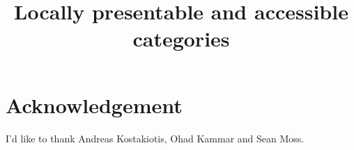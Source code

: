 \documentclass[11pt,a4paper]{article}
\title{Locally presentable and accessible categories}
\theoremstyle{margin}
\theoremstyle{nonumberplain}
\begin{document}
\maketitle

\pagebreak
\tableofcontents
\pagebreak


\parindent0cm


 \pagebreak
 \pagebreak
 \pagebreak
 \pagebreak
 \pagebreak
 \pagebreak

\section*{Acknowledgement}
I'd like to thank Andreas Kostakiotis, Ohad Kammar and Sean Moss. %


\nocite{*}

\printbibliography[title=Bibliography]
\end{document}
